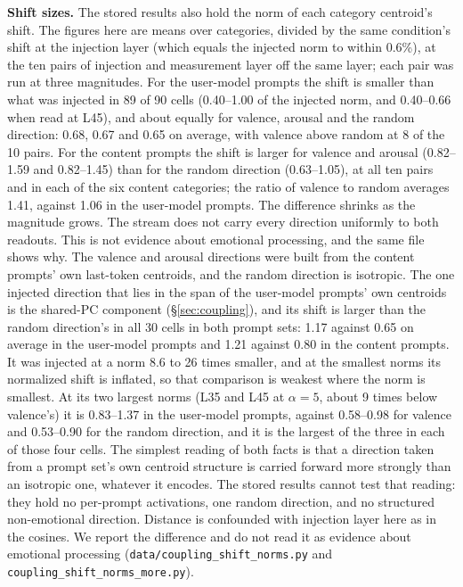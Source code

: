 \documentclass[11pt,a4paper]{article}
\begin{document}
\textbf{Shift sizes.} The stored results also hold the norm of each category centroid's shift. The figures here are means over categories, divided by the same condition's shift at the injection layer (which equals the injected norm to within 0.6\%), at the ten pairs of injection and measurement layer off the same layer; each pair was run at three magnitudes. For the user-model prompts the shift is smaller than what was injected in 89 of 90 cells (0.40--1.00 of the injected norm, and 0.40--0.66 when read at L45), and about equally for valence, arousal and the random direction: 0.68, 0.67 and 0.65 on average, with valence above random at 8 of the 10 pairs. For the content prompts the shift is larger for valence and arousal (0.82--1.59 and 0.82--1.45) than for the random direction (0.63--1.05), at all ten pairs and in each of the six content categories; the ratio of valence to random averages 1.41, against 1.06 in the user-model prompts. The difference shrinks as the magnitude grows. The stream does not carry every direction uniformly to both readouts. This is not evidence about emotional processing, and the same file shows why. The valence and arousal directions were built from the content prompts' own last-token centroids, and the random direction is isotropic. The one injected direction that lies in the span of the user-model prompts' own centroids is the shared-PC component (\S\ref{sec:coupling}), and its shift is larger than the random direction's in all 30 cells in both prompt sets: 1.17 against 0.65 on average in the user-model prompts and 1.21 against 0.80 in the content prompts. It was injected at a norm 8.6 to 26 times smaller, and at the smallest norms its normalized shift is inflated, so that comparison is weakest where the norm is smallest. At its two largest norms (L35 and L45 at $\alpha = 5$, about 9 times below valence's) it is 0.83--1.37 in the user-model prompts, against 0.58--0.98 for valence and 0.53--0.90 for the random direction, and it is the largest of the three in each of those four cells. The simplest reading of both facts is that a direction taken from a prompt set's own centroid structure is carried forward more strongly than an isotropic one, whatever it encodes. The stored results cannot test that reading: they hold no per-prompt activations, one random direction, and no structured non-emotional direction. Distance is confounded with injection layer here as in the cosines. We report the difference and do not read it as evidence about emotional processing (\texttt{data/\allowbreak coupling\_shift\_norms.py} and \texttt{coupling\_shift\_norms\_more.py}).
\end{document}
